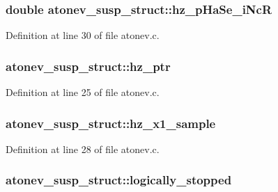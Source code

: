\subsubsection[{\texorpdfstring{hz\+\_\+p\+Ha\+Se\+\_\+i\+NcR}{hz_pHaSe_iNcR}}]{\setlength{\rightskip}{0pt plus 5cm}double atonev\+\_\+susp\+\_\+struct\+::hz\+\_\+p\+Ha\+Se\+\_\+i\+NcR}\hypertarget{structatonev__susp__struct_a0a3e3a61eb5fb4f49b507a089087eecc}{}\label{structatonev__susp__struct_a0a3e3a61eb5fb4f49b507a089087eecc}


Definition at line 30 of file atonev.\+c.

\subsubsection[{\texorpdfstring{hz\+\_\+ptr}{hz_ptr}}]{ atonev\+\_\+susp\+\_\+struct\+::hz\+\_\+ptr}\hypertarget{structatonev__susp__struct_a24efc247b41da99c238b92bf9270e10a}{}\label{structatonev__susp__struct_a24efc247b41da99c238b92bf9270e10a}


Definition at line 25 of file atonev.\+c.

\subsubsection[{\texorpdfstring{hz\+\_\+x1\+\_\+sample}{hz_x1_sample}}]{ atonev\+\_\+susp\+\_\+struct\+::hz\+\_\+x1\+\_\+sample}\hypertarget{structatonev__susp__struct_a974a40326f344cc96b6b6173a8946b71}{}\label{structatonev__susp__struct_a974a40326f344cc96b6b6173a8946b71}


Definition at line 28 of file atonev.\+c.

\subsubsection[{\texorpdfstring{logically\+\_\+stopped}{logically_stopped}}]{ atonev\+\_\+susp\+\_\+struct\+::logically\+\_\+stopped}\hypertarget{structatonev__susp__struct_a49624b6706b19b1c6d779783f0c89838}{}\label{structatonev__susp__struct_a49624b6706b19b1c6d779783f0c89838}


